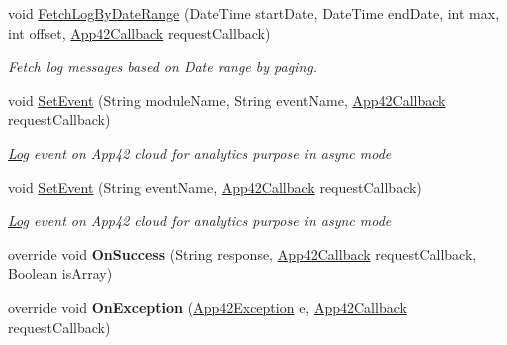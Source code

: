 \begin{DoxyCompactItemize}
void \hyperlink{classcom_1_1shephertz_1_1app42_1_1paas_1_1sdk_1_1windows_1_1log_1_1_log_service_ae783af8af441f8912361a28f310415bb}{Fetch\+Log\+By\+Date\+Range} (Date\+Time start\+Date, Date\+Time end\+Date, int max, int offset, \hyperlink{interfacecom_1_1shephertz_1_1app42_1_1paas_1_1sdk_1_1windows_1_1_app42_callback}{App42\+Callback} request\+Callback)
\begin{DoxyCompactList}\small\item\em Fetch log messages based on Date range by paging. \end{DoxyCompactList}\item 
void \hyperlink{classcom_1_1shephertz_1_1app42_1_1paas_1_1sdk_1_1windows_1_1log_1_1_log_service_a55653ab922265abf119e6ab5ebadcd6c}{Set\+Event} (String module\+Name, String event\+Name, \hyperlink{interfacecom_1_1shephertz_1_1app42_1_1paas_1_1sdk_1_1windows_1_1_app42_callback}{App42\+Callback} request\+Callback)
\begin{DoxyCompactList}\small\item\em \hyperlink{classcom_1_1shephertz_1_1app42_1_1paas_1_1sdk_1_1windows_1_1log_1_1_log}{Log} event on App42 cloud for analytics purpose in async mode \end{DoxyCompactList}\item 
void \hyperlink{classcom_1_1shephertz_1_1app42_1_1paas_1_1sdk_1_1windows_1_1log_1_1_log_service_a63aadd81b22ea342278381dbc3f8f425}{Set\+Event} (String event\+Name, \hyperlink{interfacecom_1_1shephertz_1_1app42_1_1paas_1_1sdk_1_1windows_1_1_app42_callback}{App42\+Callback} request\+Callback)
\begin{DoxyCompactList}\small\item\em \hyperlink{classcom_1_1shephertz_1_1app42_1_1paas_1_1sdk_1_1windows_1_1log_1_1_log}{Log} event on App42 cloud for analytics purpose in async mode \end{DoxyCompactList}\item 
\hypertarget{classcom_1_1shephertz_1_1app42_1_1paas_1_1sdk_1_1windows_1_1log_1_1_log_service_a18864c56c493b3195384c4abcf1066ac}{override void {\bfseries On\+Success} (String response, \hyperlink{interfacecom_1_1shephertz_1_1app42_1_1paas_1_1sdk_1_1windows_1_1_app42_callback}{App42\+Callback} request\+Callback, Boolean is\+Array)}\label{classcom_1_1shephertz_1_1app42_1_1paas_1_1sdk_1_1windows_1_1log_1_1_log_service_a18864c56c493b3195384c4abcf1066ac}

\item 
\hypertarget{classcom_1_1shephertz_1_1app42_1_1paas_1_1sdk_1_1windows_1_1log_1_1_log_service_a2c31a710276434d610fe679c17f4222b}{override void {\bfseries On\+Exception} (\hyperlink{classcom_1_1shephertz_1_1app42_1_1paas_1_1sdk_1_1windows_1_1_app42_exception}{App42\+Exception} e, \hyperlink{interfacecom_1_1shephertz_1_1app42_1_1paas_1_1sdk_1_1windows_1_1_app42_callback}{App42\+Callback} request\+Callback)}\label{classcom_1_1shephertz_1_1app42_1_1paas_1_1sdk_1_1windows_1_1log_1_1_log_service_a2c31a710276434d610fe679c17f4222b}

\end{DoxyCompactItemize}
